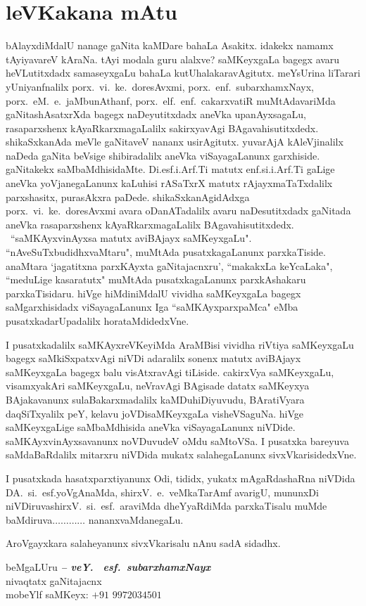 \chapter*{leVKakana mAtu}
\vskip -25pt

bAlayxdiMdalU nanage gaNita kaMDare bahaLa Asakitx. idakekx namamx tAyiyavareV kAraNa. tAyi modala 
guru alalxve? saMKeyxgaLa bagegx avaru heVLutitxdadx samaseyxgaLu bahaLa kutUhalakaravAgitutx. 
meYsUrina liTarari yUniyanfnalilx porx.\ vi.~ke.\ doresAvxmi, porx.\ enf.\ subarxhamxNayx, 
porx.\ eM.\ e.\ jaMbunAthanf, porx.\ elf.~enf.~cakarxvatiR muMtAdavariMda gaNitashAsatxrXda bagegx    naDeyutitxdadx aneVka upanAyxsagaLu, rasaparxshenx kAyaR\-karxmagaLalilx sakirxyavAgi BAgavahisutitxdedx. shikaSxkanAda meVle gaNitaveV nananx usirAgitutx. yuvarAjA kAleVjinalilx naDeda gaNita beVsige shibiradalilx aneVka viSayagaLanunx garxhiside. gaNitakekx saMbaMdhisidaMte. Di.esf.i.Arf.Ti matutx enf.si.i.Arf.Ti gaLige aneVka yoVjanegaLanunx kaLuhisi rASaTxrX matutx rAjayxmaTaTxdalilx parxshasitx, purasAkxra paDede. shikaSxkanAgidAdxga porx.~vi.~ke.\ doresAvxmi avara oDanATadalilx avaru naDesutitxdadx gaNitada aneVka rasaparxshenx kAyaRkarxmagaLalilx BAgavahisutitxdedx. ~``saMKAyxvinAyxsa matutx aviBAjayx saMKeyxgaLu". ``nAveSuTx\-budidhxvaMtaru", muMtAda pusatxkagaLanunx parxkaTiside. anaMtara `jagatitxna parxKAyxta gaNitajacnxru', ``makakxLa keYcaLaka", ``meduLige kasaratutx" muMtAda pusatxkagaLanunx parxkAshakaru parxkaTisidaru. hiVge hiMdiniMdalU vividha saMKeyxgaLa bagegx saMgarxhisidadx viSayagaLanunx Iga ``saMKAyxparxpaMca" eMba pusatxkadarUpadalilx horataMdidedxVne. 

I pusatxkadalilx saMKAyxreVKeyiMda AraMBisi vividha riVtiya saMKeyxgaLu bagegx saMkiSxpatxvAgi niVDi adaralilx sonenx matutx aviBAjayx saMKeyxgaLa bagegx balu visAtxravAgi tiLiside. cakirxVya saMKeyxgaLu, visamxyakAri saMKeyxgaLu, neVravAgi BAgisade datatx saMKeyxya BAjakavanunx sulaBakarxmadalilx kaMDuhiDiyuvudu, BAratiVyara daqSiTxyalilx peY, kelavu joVDisaMKeyxgaLa visheVSaguNa. hiVge saMKeyxgaLige saMbaMdhisida aneVka viSayagaLanunx niVDide. saMKAyxvinAyxsavanunx noVDuvudeV oMdu saMtoVSa. I pusatxka bareyuva saMdaBaRdalilx mitarxru niVDida mukatx salahegaLanunx sivxVkarisidedxVne.

I pusatxkada hasatxparxtiyanunx Odi, tididx, yukatx mAgaRdashaRna niVDida DA.~si.~esf.\break yoVgAnaMda, shirxV.~e.~veMkaTarAmf avarigU, mununxDi niVDiruva\break shirxV.~si.~esf.~araviMda dheYyaRdiMda parxkaTisalu muMde baMdiruva$\ldots\ldots\ldots\ldots$ nananx\break vaMdanegaLu.

AroVgayxkara salaheyanunx sivxVkarisalu nAnu sadA sidadhx.

\begin{flushright}
beMgaLUru \hfill {\sl\bfseries {\rm --} veY. ~esf.\ subarxhamxNayx}\hfill\\
nivaqtatx gaNitajacnx\\
mobeYlf saMKeyx: $+91$ $9972034501$
\end{flushright}


